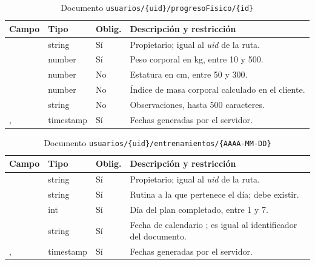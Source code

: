 \begin{table}[H]
\centering
\small
\begin{tabularx}{\textwidth}{|L{3.0cm}|L{1.9cm}|C{1.2cm}|Y|}
\hline
{} \textbf{Campo} & \textbf{Tipo} & \textbf{Oblig.} & \textbf{Descripción y restricción} \\
\hline
{} & string & Sí & Propietario; igual al \emph{uid} de la ruta. \\ \hline
{} & number & Sí & Peso corporal en kg, entre 10 y 500. \\ \hline
{} & number & No & Estatura en cm, entre 50 y 300. \\ \hline
{} & number & No & Índice de masa corporal calculado en el cliente. \\ \hline
{} & string & No & Observaciones, hasta 500 caracteres. \\ \hline
{},  & timestamp & Sí & Fechas generadas por el servidor. \\
\hline
\end{tabularx}
\caption{Documento \texttt{usuarios/\{uid\}/progresoFisico/\{id\}}}
\label{tab:dd-progreso}
\end{table}

\begin{table}[H]
\centering
\small
\begin{tabularx}{\textwidth}{|L{3.0cm}|L{1.9cm}|C{1.2cm}|Y|}
\hline
{} \textbf{Campo} & \textbf{Tipo} & \textbf{Oblig.} & \textbf{Descripción y restricción} \\
\hline
{} & string & Sí & Propietario; igual al \emph{uid} de la ruta. \\ \hline
{} & string & Sí & Rutina a la que pertenece el día; debe existir. \\ \hline
{} & int & Sí & Día del plan completado, entre 1 y 7. \\ \hline
{} & string & Sí & Fecha de calendario ; es igual al identificador del documento. \\ \hline
{},  & timestamp & Sí & Fechas generadas por el servidor. \\
\hline
\end{tabularx}
\caption{Documento \texttt{usuarios/\{uid\}/entrenamientos/\{AAAA-MM-DD\}}}
\label{tab:dd-entrenamientos}
\end{table}

